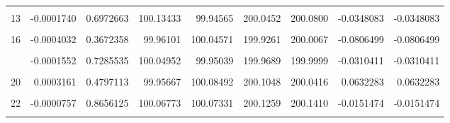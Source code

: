 \documentclass[a4paper]{tufte-handout}
\begin{document}
\begin{table}
{\begin{tabular}[t]{rrrrrrrrr}
\addlinespace
\cellcolor{gray!6}{12} & \cellcolor{gray!6}{-0.0004302} & \cellcolor{gray!6}{0.3360899} & \cellcolor{gray!6}{100.09555} & \cellcolor{gray!6}{100.03086} & \cellcolor{gray!6}{200.0403} & \cellcolor{gray!6}{200.1264} & \cellcolor{gray!6}{-0.0860911} & \cellcolor{gray!6}{-0.0860911}\\
13 & -0.0001740 & 0.6972663 & 100.13433 & 99.94565 & 200.0452 & 200.0800 & -0.0348083 & -0.0348083\\
\cellcolor{gray!6}{15} & \cellcolor{gray!6}{-0.0002304} & \cellcolor{gray!6}{0.6064396} & \cellcolor{gray!6}{100.03044} & \cellcolor{gray!6}{99.97619} & \cellcolor{gray!6}{199.9606} & \cellcolor{gray!6}{200.0066} & \cellcolor{gray!6}{-0.0460791} & \cellcolor{gray!6}{-0.0460791}\\
16 & -0.0004032 & 0.3672358 & 99.96101 & 100.04571 & 199.9261 & 200.0067 & -0.0806499 & -0.0806499\\
\cellcolor{gray!6}{17} & \cellcolor{gray!6}{-0.0002355} & \cellcolor{gray!6}{0.5985000} & \cellcolor{gray!6}{99.86689} & \cellcolor{gray!6}{99.91427} & \cellcolor{gray!6}{199.7341} & \cellcolor{gray!6}{199.7812} & \cellcolor{gray!6}{-0.0470453} & \cellcolor{gray!6}{-0.0470453}\\
\addlinespace
18 & -0.0001552 & 0.7285535 & 100.04952 & 99.95039 & 199.9689 & 199.9999 & -0.0310411 & -0.0310411\\
\cellcolor{gray!6}{19} & \cellcolor{gray!6}{-0.0003013} & \cellcolor{gray!6}{0.5004650} & \cellcolor{gray!6}{99.93607} & \cellcolor{gray!6}{99.93441} & \cellcolor{gray!6}{199.8103} & \cellcolor{gray!6}{199.8705} & \cellcolor{gray!6}{-0.0602238} & \cellcolor{gray!6}{-0.0602238}\\
20 & 0.0003161 & 0.4797113 & 99.95667 & 100.08492 & 200.1048 & 200.0416 & 0.0632283 & 0.0632283\\
\cellcolor{gray!6}{21} & \cellcolor{gray!6}{-0.0008416} & \cellcolor{gray!6}{0.0598590} & \cellcolor{gray!6}{100.04632} & \cellcolor{gray!6}{100.12057} & \cellcolor{gray!6}{199.9984} & \cellcolor{gray!6}{200.1669} & \cellcolor{gray!6}{-0.1684565} & \cellcolor{gray!6}{-0.1684565}\\
22 & -0.0000757 & 0.8656125 & 100.06773 & 100.07331 & 200.1259 & 200.1410 & -0.0151474 & -0.0151474\\
\addlinespace
\cellcolor{gray!6}{24} & \cellcolor{gray!6}{0.0002168} & \cellcolor{gray!6}{0.6278622} & \cellcolor{gray!6}{99.99654} & \cellcolor{gray!6}{100.03160} & \cellcolor{gray!6}{200.0715} & \cellcolor{gray!6}{200.0281} & \cellcolor{gray!6}{0.0433624} & \cellcolor{gray!6}{0.0433624}\\

\end{tabular}}
\end{table}
\end{document}

